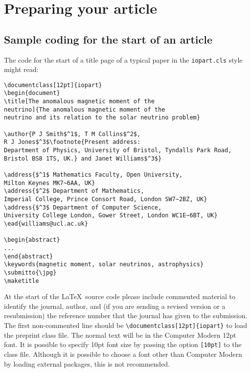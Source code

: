 \documentclass[12pt]{iopart}
\begin{document}
\section{Preparing your article}

\subsection{Sample coding for the start of an article}
\label{startsample}
The code for the start of a title page of a typical paper in the \verb"iopart.cls" style might read:
\small\begin{verbatim}
\documentclass[12pt]{iopart}
\begin{document}
\title[The anomalous magnetic moment of the 
neutrino]{The anomalous magnetic moment of the 
neutrino and its relation to the solar neutrino problem}

\author{P J Smith$^1$, T M Collins$^2$, 
R J Jones$^3$\footnote{Present address:
Department of Physics, University of Bristol, Tyndalls Park Road, 
Bristol BS8 1TS, UK.} and Janet Williams$^3$}

\address{$^1$ Mathematics Faculty, Open University, 
Milton Keynes MK7~6AA, UK}
\address{$^2$ Department of Mathematics, 
Imperial College, Prince Consort Road, London SW7~2BZ, UK}
\address{$^3$ Department of Computer Science, 
University College London, Gower Street, London WC1E~6BT, UK}
\ead{williams@ucl.ac.uk}

\begin{abstract}
...
\end{abstract}
\keywords{magnetic moment, solar neutrinos, astrophysics}
\submitto{\jpg}
\maketitle
\end{verbatim}
\normalsize

At the start of the \LaTeX\ source code please include 
commented material to identify the journal, author, and (if you are sending a revised
version or a resubmission) the reference number that the journal
has given to the submission. The first non-commented line should be 
\verb"\documentclass[12pt]{iopart}"  to load the preprint class 
file.  The normal text will be in the Computer Modern 12pt font.
It is possible to specify 10pt font size by passing the option \verb"[10pt]" to the class file.
Although it is possible to choose a font other than Computer Modern by loading external packages, this is not recommended.
\end{document}
